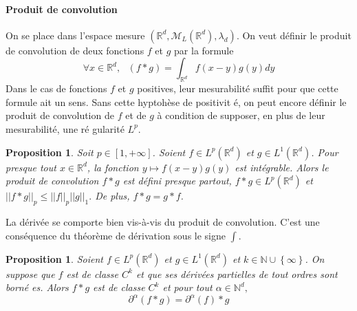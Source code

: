 \documentclass[3pt]{article}
\newtheorem{proposition}[theorem]{Proposition}
\begin{document}
\bigskip 

\paragraph{Produit de convolution}

On se place dans l'espace mesure $(\mathbb{R}^{d},\mathcal{M}_{L}(\mathbb{R}%
^{d}),\lambda _{d})$. On veut d\'{e}finir le produit de convolution de deux
fonctions $f$ et $g$ par la formule%
\begin{equation*}
\forall x\in \mathbb{R}^{d},\text{ }(f\ast g)=\int_{\mathbb{R}%
^{d}}f(x-y)g(y)dy
\end{equation*}%
Dans le cas de fonctions $f$ et $g$ positives, leur mesurabilit\'{e} suffit
pour que cette formule ait un sens. Sans cette hyptoh\`{e}se de positivit%
\'{e}, on peut encore d\'{e}finir le produit de convolution de $f$ et de $g$ 
\`{a} condition de supposer, en plus de leur mesurabilit\'{e}, une r\'{e}%
gularit\'{e} $L^{p}$.

\bigskip 

\begin{proposition}
Soit $p\in \left[ 1,+\infty \right] $. Soient $f\in L^{p}(\mathbb{R}^{d})$
et $g\in L^{1}(\mathbb{R}^{d})$. Pour presque tout $x\in \mathbb{R}^{d}$, la
fonction $y\mapsto f(x-y)g(y)$ est int\'{e}grable. Alors le produit de
convolution $f\ast g$ est d\'{e}fini presque partout, $f\ast g\in L^{p}(%
\mathbb{R}^{d})$ et $\left\vert \left\vert f\ast g\right\vert \right\vert
_{p}\leq \left\vert \left\vert f\right\vert \right\vert _{p}\left\vert
\left\vert g\right\vert \right\vert _{1}.$ De plus, $f\ast g=g\ast f$.
\end{proposition}

\bigskip 

La d\'{e}riv\'{e}e se comporte bien vis-\`{a}-vis du produit de convolution.
C'est une cons\'{e}quence du th\'{e}or\`{e}me de d\'{e}rivation sous le
signe $\int .$

\bigskip 

\begin{proposition}
Soient $f\in L^{p}(\mathbb{R}^{d})$ et $g\in L^{1}(\mathbb{R}^{d})$ et $k\in 
\mathbb{N\cup }\left\{ \infty \right\} $. On suppose que $f$ est de classe $%
C^{k}$ et que ses d\'{e}riv\'{e}es partielles de tout ordres sont born\'{e}%
es. Alors $f\ast g$ est de classe $C^{k}$ et pour tout $\alpha \in \mathbb{N}%
^{d},$%
\begin{equation*}
\partial ^{\alpha }\left( f\ast g\right) =\partial ^{\alpha }\left( f\right)
\ast g
\end{equation*}
\end{proposition}
\end{document}
